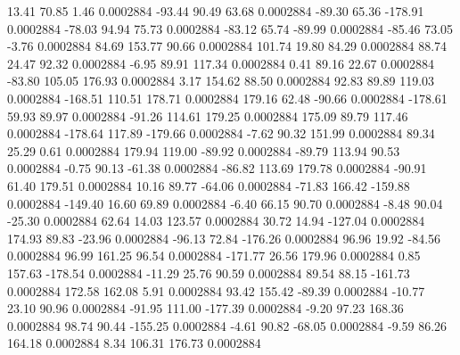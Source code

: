        13.41       70.85        1.46     0.0002884
      -93.44       90.49       63.68     0.0002884
      -89.30       65.36     -178.91     0.0002884
      -78.03       94.94       75.73     0.0002884
      -83.12       65.74      -89.99     0.0002884
      -85.46       73.05       -3.76     0.0002884
       84.69      153.77       90.66     0.0002884
      101.74       19.80       84.29     0.0002884
       88.74       24.47       92.32     0.0002884
       -6.95       89.91      117.34     0.0002884
        0.41       89.16       22.67     0.0002884
      -83.80      105.05      176.93     0.0002884
        3.17      154.62       88.50     0.0002884
       92.83       89.89      119.03     0.0002884
     -168.51      110.51      178.71     0.0002884
      179.16       62.48      -90.66     0.0002884
     -178.61       59.93       89.97     0.0002884
      -91.26      114.61      179.25     0.0002884
      175.09       89.79      117.46     0.0002884
     -178.64      117.89     -179.66     0.0002884
       -7.62       90.32      151.99     0.0002884
       89.34       25.29        0.61     0.0002884
      179.94      119.00      -89.92     0.0002884
      -89.79      113.94       90.53     0.0002884
       -0.75       90.13      -61.38     0.0002884
      -86.82      113.69      179.78     0.0002884
      -90.91       61.40      179.51     0.0002884
       10.16       89.77      -64.06     0.0002884
      -71.83      166.42     -159.88     0.0002884
     -149.40       16.60       69.89     0.0002884
       -6.40       66.15       90.70     0.0002884
       -8.48       90.04      -25.30     0.0002884
       62.64       14.03      123.57     0.0002884
       30.72       14.94     -127.04     0.0002884
      174.93       89.83      -23.96     0.0002884
      -96.13       72.84     -176.26     0.0002884
       96.96       19.92      -84.56     0.0002884
       96.99      161.25       96.54     0.0002884
     -171.77       26.56      179.96     0.0002884
        0.85      157.63     -178.54     0.0002884
      -11.29       25.76       90.59     0.0002884
       89.54       88.15     -161.73     0.0002884
      172.58      162.08        5.91     0.0002884
       93.42      155.42      -89.39     0.0002884
      -10.77       23.10       90.96     0.0002884
      -91.95      111.00     -177.39     0.0002884
       -9.20       97.23      168.36     0.0002884
       98.74       90.44     -155.25     0.0002884
       -4.61       90.82      -68.05     0.0002884
       -9.59       86.26      164.18     0.0002884
        8.34      106.31      176.73     0.0002884
